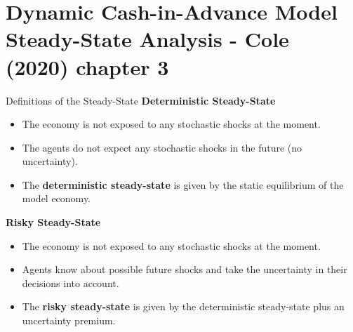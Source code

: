 \documentclass[10pt,c,aspectratio=1610,handout]{beamer}
\begin{document}
\section{Dynamic Cash-in-Advance Model\\\small{Steady-State Analysis - Cole (2020) chapter 3}}%
\begin{frame}{Definitions of the Steady-State}%
  \textbf{Deterministic Steady-State}%
  \begin{small}%
  \begin{itemize}%
    \item[$\blacktriangleright$] The economy is not exposed to any stochastic shocks at the moment.%
    \item[$\blacktriangleright$] The agents do not expect any stochastic shocks in the future (no uncertainty).%
    \item[$\Rightarrow$] The \textbf{deterministic steady-state} is given by the static equilibrium of the model economy.%
  \end{itemize}%
  \end{small}%
  \vspace*{0.25in}%
  \pause%
  \textbf{Risky Steady-State}%
  \begin{small}%
  \begin{itemize}%
    \item[$\blacktriangleright$] The economy is not exposed to any stochastic shocks at the moment.%
    \item[$\blacktriangleright$] Agents know about possible future shocks and take the uncertainty in their decisions into account.%
    \item[$\Rightarrow$] The \textbf{risky steady-state} is given by the deterministic steady-state plus an uncertainty premium.%
  \end{itemize}%
  \end{small}%
\end{frame}%
\end{document}
